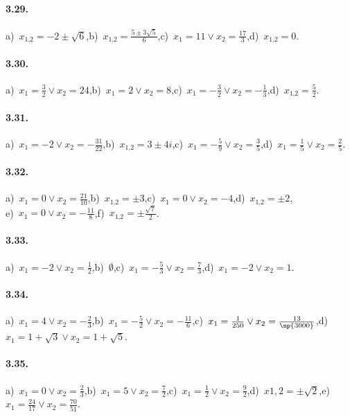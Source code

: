 \paragraph{3.29.} a)~$x_{1\text{,}2} = -2\pm \sqrt{6}$,\quad b)~$x_{1\text{,}2} =\frac{5 \pm 3\sqrt{5}}{6}$,\quad c)~$x_{1} =11 \vee x_{2} =\frac{17}{3}$,\quad d)~$x_{1\text{,}2} =0$.

\paragraph{3.30.} a)~$x_{1} =\frac{3}{2} \vee x_{2} =24$,\quad b)~$x_{1} =2 \vee x_{2} =8$,\quad c)~$x_{1} =-\frac{3}{2} \vee x_{2} =-\frac{1}{3}$,\quad d)~$x_{1\text{,}2} =\frac{5}{2}$.

\paragraph{3.31.} a)~$x_{1} =-2 \vee x_{2} = -\frac{31}{22}$,\quad b)~$x_{1\text{,}2} =3\pm 4{i}$,\quad c)~$x_{1} =-\frac{5}{9} \vee x_{2} =\frac{3}{5}$,\quad d)~$x_{1} =\frac{1}{5} \vee x_{2} =\frac{2}{5}$.

\paragraph{3.32.} a)~$x_{1} =0 \vee x_{2} =\frac{21}{10}$,\quad b)~$x_{1\text{,}2} =\pm 3$,\quad c)~$x_{1} =0 \vee x_{2} =-4$,\quad d)~$x_{1\text{,}2} =\pm 2$,\protect\\
e)~$x_{1} =0 \vee x_{2} =-\frac{11}{8}$,\quad f)~$x_{1\text{,}2} =\pm \frac{ \sqrt{7}}{2}$.

\paragraph{3.33.} a)~$x_{1} =-2 \vee x_{2} = \frac{1}{2}$,\quad b)~$\emptyset$,\quad c)~$x_1=-\frac{5}{3} \vee x_2=\frac{7}{3}$,\quad d)~$x_1=-2 \vee x_2=1$.

\paragraph{3.34.} a)~$x_{1} = 4 \vee x_{2} =-\frac{2}{3}$,\quad b)~$x_{1} =-\frac{5}{2} \vee x_{2} =-\frac{11}{6}$,\quad c)~$x_{1} =\frac{1}{250} \vee x_{2} =\frac{13}{\np{3000}}$,\quad d)~$x_{1} = 1 + \sqrt{3} \vee x_{2} = 1 + \sqrt{5}$.

\paragraph{3.35.} a)~$x_{1} =0 \vee x_{2} =\frac{2}{3}$,\quad b)~$x_{1} = 5 \vee x_{2} = \frac{7}{2}$,\quad c)~$x_{1} =\frac{1}{2}                                                                                                                                                                                                                                                                                                                                                                                                                                         \vee x_{2} =\frac{9}{2}$,\quad d)~$x{1,2}= \pm \sqrt{2}$,\quad e)~$x_{1} = \frac{24}{17} \vee x_{2} = \frac{70}{51}$.

